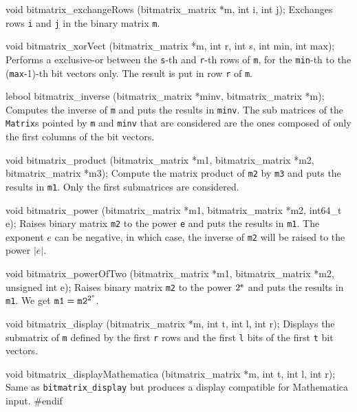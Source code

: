 void bitmatrix_exchangeRows (bitmatrix_matrix *m, int i, int j);
\endcode
 \tab
Exchanges rows {\tt i} and {\tt j} in the binary matrix {\tt *m}.
 \endtab
\code

void bitmatrix_xorVect (bitmatrix_matrix *m, int r, int s, int min, int max);
\endcode
 \tab
Performs a exclusive-or between the {\tt s}-th and {\tt r}-th rows of {\tt m},
for the {\tt min}-th to the ({\tt max}-1)-th bit vectors only.  
The result is put in row {\tt r} of {\tt m}.
 \endtab
\code 

lebool bitmatrix_inverse (bitmatrix_matrix *minv, bitmatrix_matrix *m);
\endcode
\tab
Computes the inverse of {\tt m} and puts the results in {\tt minv}.
The sub matrices of the {\tt Matrix}s pointed by {\tt m} and {\tt minv} that 
are considered are the ones composed of only the first columns of the bit vectors.
\endtab
\code

void bitmatrix_product (bitmatrix_matrix *m1, bitmatrix_matrix *m2,
                        bitmatrix_matrix *m3);
\endcode
\tab
Compute the matrix product of {\tt m2} by {\tt m3} and puts the results in {\tt m1}.
Only the first submatrices are considered. 
\endtab
\code

void bitmatrix_power (bitmatrix_matrix *m1, bitmatrix_matrix *m2, int64_t e);
\endcode
\tab
Raises binary matrix {\tt m2} to the power {\tt e} and puts the results in {\tt m1}.
The exponent $e$ can be negative, in which case, the inverse of {\tt m2}
will be raised to the power $|e|$.
\endtab
\code

void bitmatrix_powerOfTwo (bitmatrix_matrix *m1, bitmatrix_matrix *m2,
                           unsigned int e);
\endcode
\tab
Raises binary matrix {\tt m2} to the power $2^{\tt e}$ and puts the results in {\tt m1}.
We get ${\tt m1} = {\tt m2}^{2^{e}}$.
\endtab
\code

void bitmatrix_display (bitmatrix_matrix *m, int t, int l, int r);
\endcode
 \tab
Displays the submatrix of {\tt *m} defined by the first {\tt r} rows and the 
first {\tt l} bits of the first {\tt t} bit vectors.  
 \endtab
\code

void bitmatrix_displayMathematica (bitmatrix_matrix *m, int t, int l, int r);
\endcode
 \tab
Same as \texttt{bitmatrix\_display} but produces a display compatible for
Mathematica input.
 \endtab
\code\hide
#endif
\endhide\endcode
